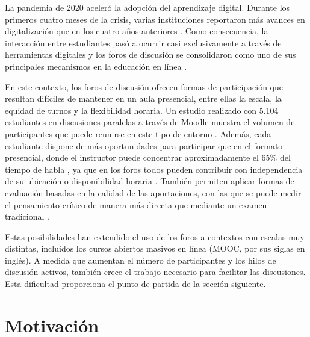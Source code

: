 La pandemia de 2020 aceleró la adopción del aprendizaje digital. Durante los primeros cuatro meses de la crisis, varias instituciones reportaron más avances en digitalización que en los cuatro años anteriores \parencite{GaebelEtAl2021}. Como consecuencia, la interacción entre estudiantes pasó a ocurrir casi exclusivamente a través de herramientas digitales y los foros de discusión se consolidaron como uno de sus principales mecanismos en la educación en línea \parencite{Rovai2007,MasseyEtAl2019}.

En este contexto, los foros de discusión ofrecen formas de participación que resultan difíciles de mantener en un aula presencial, entre ellas la escala, la equidad de turnos y la flexibilidad horaria. Un estudio realizado con 5.104 estudiantes en discusiones paralelas a través de Moodle muestra el volumen de participantes que puede reunirse en este tipo de entorno \parencite{ZulfikarEtAl2019}. Además, cada estudiante dispone de más oportunidades para participar que en el formato presencial, donde el instructor puede concentrar aproximadamente el 65\% del tiempo de habla \parencite{SullivanPratt1996}, ya que en los foros todos pueden contribuir con independencia de su ubicación o disponibilidad horaria \parencite{MasseyEtAl2019}. También permiten aplicar formas de evaluación basadas en la calidad de las aportaciones, con las que se puede medir el pensamiento crítico de manera más directa que mediante un examen tradicional \parencite{HoSwan2007,Rovai2007}.

Estas posibilidades han extendido el uso de los foros a contextos con escalas muy distintas, incluidos los cursos abiertos masivos en línea (MOOC, por sus siglas en inglés). A medida que aumentan el número de participantes y los hilos de discusión activos, también crece el trabajo necesario para facilitar las discusiones. Esta dificultad proporciona el punto de partida de la sección siguiente.

\section{Motivación}


